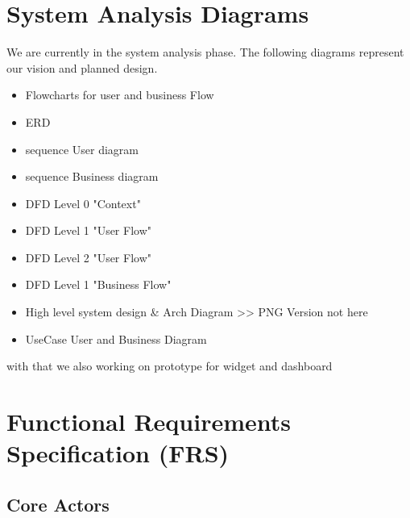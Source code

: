 \documentclass[12pt,a4paper]{article}
\begin{document}
\section{System Analysis Diagrams}
We are currently in the system analysis phase.  
The following diagrams represent our vision and planned design.
\begin{itemize}
    \item Flowcharts for user and business Flow
    \item ERD 
    \item sequence User diagram 
    \item sequence Business diagram
    \item DFD Level 0 "Context" 
    \item DFD Level 1 "User Flow" 
    \item DFD Level 2 "User Flow" 
    \item DFD Level 1 "Business Flow"
    \item High level system design \& Arch Diagram >> PNG Version not here
    \item UseCase User and Business Diagram
\end{itemize}

with that we also working on prototype for widget and dashboard













\section{Functional Requirements Specification (FRS)}
\subsection{Core Actors}
\end{document}
